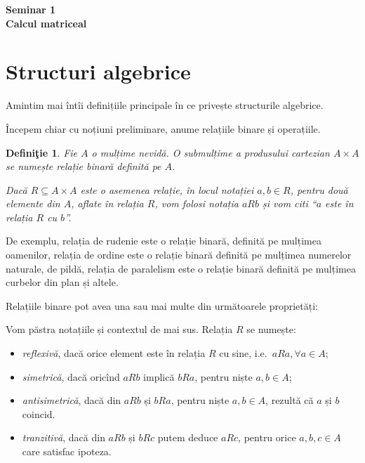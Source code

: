 \documentclass[11pt,a4paper]{article}
\newcommand\qq{\enquote}
\newcommand\seq{\subseteq}
\theoremstyle{dotless}
\theoremstyle{dotlessdr}
\newtheorem{definition}{Defini\c{t}ie}[section]
\begin{document}
\begin{center}
  {\large\textbf{Seminar 1 \\ Calcul matriceal}}
\end{center}

\vspace{1cm}

\section{Structuri algebrice}

\indent\indent Amintim mai întîi definițiile principale în ce privește structurile algebrice.

Începem chiar cu noțiuni preliminare, anume relațiile binare și operațiile.

\begin{definition}\label{def:rel-bin}
  Fie $A$ o mulțime nevidă. O submulțime a produsului cartezian $A \times A$ se
  numește \emph{relație binară definită pe $A$}.

  Dacă $R \seq A \times A$ este o asemenea relație, în locul notației $a, b \in R$,
  pentru două elemente din $A$, aflate în relația $R$, vom folosi notația $a R b$ și
  vom citi \qq{$a$ este în relația $R$ cu $b$}.
\end{definition}

De exemplu, relația de rudenie este o relație binară, definită pe mulțimea oamenilor,
relația de ordine este o relație binară definită pe mulțimea numerelor naturale, de
pildă, relația de paralelism este o relație binară definită pe mulțimea curbelor din
plan și altele.

Relațiile binare pot avea una sau mai multe din următoarele proprietăți:

Vom păstra notațiile și contextul de mai sus. Relația $R$ se numește:
\begin{itemize}
  \item \emph{reflexivă}, dacă orice element este în relația $R$ cu sine, i.e.\
    $a R a, \forall a \in A$;
  \item \emph{simetrică}, dacă oricînd $a R b$ implică $b R a$, pentru niște $a, b \in A$;
  \item \emph{antisimetrică}, dacă din $a R b$ și $b R a$, pentru niște $a, b \in A$,  
    rezultă că $a$ și $b$ coincid.
  \item \emph{tranzitivă}, dacă din $a R b$ și $b R c$ putem deduce $a R c$, pentru orice
    $a, b, c \in A$ care satisfac ipoteza.
\end{itemize}
\end{document}
